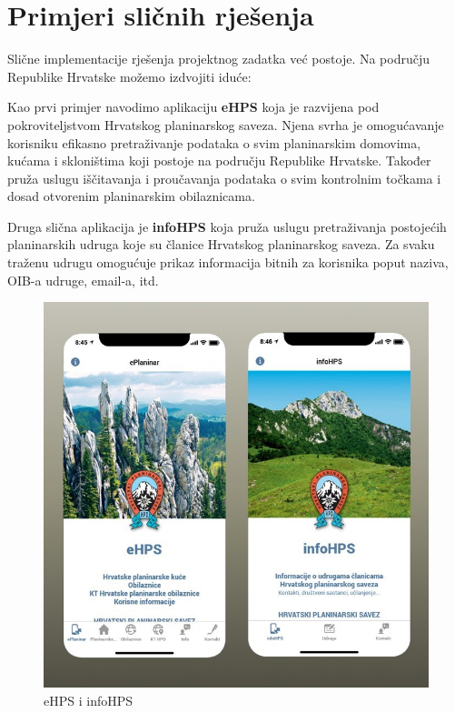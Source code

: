 		\section{Primjeri sličnih rješenja}
		Slične implementacije rješenja projektnog zadatka već postoje. Na području Republike Hrvatske možemo izdvojiti iduće: 
		\begin{packed_enum}
			\item Kao prvi primjer navodimo aplikaciju \textbf{eHPS} koja je razvijena pod pokroviteljstvom Hrvatskog planinarskog saveza. Njena svrha je omogućavanje korisniku efikasno pretraživanje podataka o svim planinarskim domovima, kućama i skloništima koji postoje na području Republike Hrvatske. Također pruža uslugu iščitavanja i proučavanja podataka o svim kontrolnim točkama i dosad otvorenim planinarskim obilaznicama.
			\item Druga slična aplikacija je \textbf{infoHPS} koja pruža uslugu pretraživanja postojećih planinarskih udruga koje su članice Hrvatskog planinarskog saveza. Za svaku traženu udrugu omogućuje prikaz informacija bitnih za korisnika poput naziva, OIB-a udruge, email-a, itd. 
		\end{packed_enum}
	
			\begin{figure}[H]
			\includegraphics[scale=0.5]{slike/HPS.jpg} %
			\centering
			\caption{eHPS i infoHPS}
			\label{fig:slične aplikacije}
			\end{figure}
	
